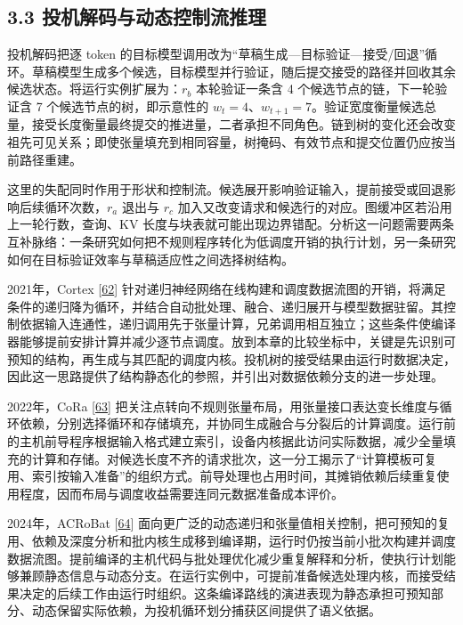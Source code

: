 \documentclass[UTF8,10.5pt,fontset=windows]{ctexart}
\begin{document}
\hypertarget{section-3-3}{%
\subsection{3.3 投机解码与动态控制流推理}\label{section-3-3}}

投机解码把逐 token
的目标模型调用改为``草稿生成---目标验证---接受/回退''循环。草稿模型生成多个候选，目标模型并行验证，随后提交接受的路径并回收其余候选状态。将运行实例扩展为：\(r_b\)
本轮验证一条含 4 个候选节点的链，下一轮验证含 7
个候选节点的树，即示意性的
\(w_t=4\)、\(w_{t+1}=7\)。验证宽度衡量候选总量，接受长度衡量最终提交的推进量，二者承担不同角色。链到树的变化还会改变祖先可见关系；即使张量填充到相同容量，树掩码、有效节点和提交位置仍应按当前路径重建。

这里的失配同时作用于形状和控制流。候选展开影响验证输入，提前接受或回退影响后续循环次数，\(r_a\)
退出与 \(r_c\)
加入又改变请求和候选行的对应。图缓冲区若沿用上一轮行数，查询、KV
长度与块表就可能出现边界错配。分析这一问题需要两条互补脉络：一条研究如何把不规则程序转化为低调度开销的执行计划，另一条研究如何在目标验证效率与草稿适应性之间选择树结构。

2021年，Cortex {[}\protect\hyperlink{ref-fegade2021cortex}{62}{]}
针对递归神经网络在线构建和调度数据流图的开销，将满足条件的递归降为循环，并结合自动批处理、融合、递归展开与模型数据驻留。其控制依据输入连通性，递归调用先于张量计算，兄弟调用相互独立；这些条件使编译器能够提前安排计算并减少逐节点调度。放到本章的比较坐标中，关键是先识别可预知的结构，再生成与其匹配的调度内核。投机树的接受结果由运行时数据决定，因此这一思路提供了结构静态化的参照，并引出对数据依赖分支的进一步处理。

2022年，CoRa {[}\protect\hyperlink{ref-fegade2022cora}{63}{]}
把关注点转向不规则张量布局，用张量接口表达变长维度与循环依赖，分别选择循环和存储填充，并协同生成融合与分裂后的计算调度。运行前的主机前导程序根据输入格式建立索引，设备内核据此访问实际数据，减少全量填充的计算和存储。对候选长度不齐的请求批次，这一分工揭示了``计算模板可复用、索引按输入准备''的组织方式。前导处理也占用时间，其摊销依赖后续重复使用程度，因而布局与调度收益需要连同元数据准备成本评价。

2024年，ACRoBat {[}\protect\hyperlink{ref-fegade2024acrobat}{64}{]}
面向更广泛的动态递归和张量值相关控制，把可预知的复用、依赖及深度分析和批内核生成移到编译期，运行时仍按当前小批次构建并调度数据流图。提前编译的主机代码与批处理优化减少重复解释和分析，使执行计划能够兼顾静态信息与动态分支。在运行实例中，可提前准备候选处理内核，而接受结果决定的后续工作由运行时组织。这条编译路线的演进表现为静态承担可预知部分、动态保留实际依赖，为投机循环划分捕获区间提供了语义依据。
\end{document}

